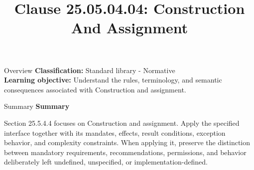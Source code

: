 \documentclass[10pt,letterpaper]{article}
\title{Clause 25.05.04.04: Construction And Assignment}
\author{}
\date{}
\begin{document}
\maketitle
\begin{CornellOverviewBox}{Overview}
\textbf{Classification:} Standard library - Normative\\[2pt]
\textbf{Learning objective:} Understand the rules, terminology, and semantic consequences associated with Construction and assignment.
\end{CornellOverviewBox}\begin{CornellSummaryBox}{Summary}
{\sffamily\bfseries\color{Accent} Summary}\par\vspace{3pt}Section 25.5.4.4 focuses on Construction and assignment. Apply the specified interface together with its mandates, effects, result conditions, exception behavior, and complexity constraints. When applying it, preserve the distinction between mandatory requirements, recommendations, permissions, and behavior deliberately left undefined, unspecified, or implementation-defined.
\end{CornellSummaryBox}
\end{document}
